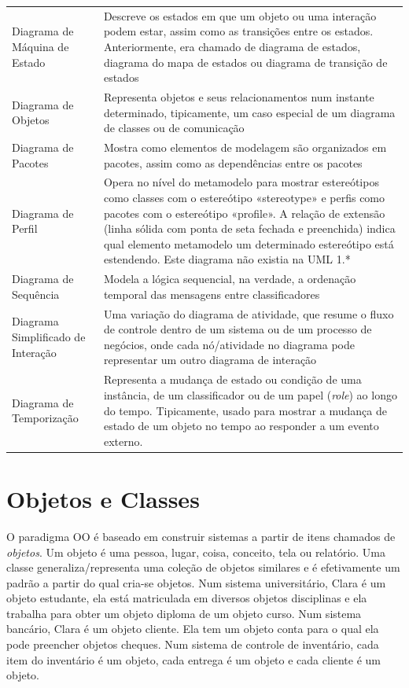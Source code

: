 \begin{longtable}[l]{p{4.7cm}p{11cm}}
Diagrama de Máquina de Estado & Descreve os estados em que um objeto ou uma interação podem estar, assim como as transições entre os estados. Anteriormente, era chamado de diagrama de estados, diagrama do mapa de estados ou diagrama de transição de estados  \\

Diagrama de Objetos & Representa objetos e seus relacionamentos num instante determinado, tipicamente, um caso especial de um diagrama de classes ou de comunicação \\

Diagrama de Pacotes & Mostra como elementos de modelagem são organizados em pacotes, assim como as dependências entre os pacotes \\

Diagrama de Perfil & Opera no nível do metamodelo para mostrar estereótipos como classes com o estereótipo «stereotype» e perfis como pacotes com o estereótipo «profile». A relação de extensão (linha sólida com ponta de seta fechada e preenchida) indica qual elemento metamodelo um determinado estereótipo está estendendo. Este diagrama não existia na UML 1.* \\

Diagrama de Sequência & Modela a lógica sequencial, na verdade, a ordenação temporal das mensagens entre classificadores \\

Diagrama Simplificado de Interação & Uma variação do diagrama de atividade, que resume o fluxo de controle dentro de um sistema ou de um processo de negócios, onde cada nó/atividade no diagrama pode representar um outro diagrama de interação \\

Diagrama de Temporização & Representa a mudança de estado ou condição de uma instância, de um classificador ou de um papel (\textit{role}) ao longo do tempo. Tipicamente, usado para mostrar a mudança de estado de um objeto no tempo ao responder a um evento externo. \\

\end{longtable}

\section{Objetos e Classes}

O paradigma OO é baseado em construir sistemas a partir de itens chamados de \emph{objetos}. Um objeto é uma pessoa, lugar, coisa, conceito, tela ou relatório. Uma classe generaliza/representa uma coleção de objetos similares e é efetivamente um padrão a partir do qual cria-se objetos. Num sistema universitário, Clara é um objeto estudante, ela está matriculada em diversos objetos disciplinas e ela trabalha para obter um objeto diploma de um objeto curso. Num sistema bancário, Clara é um objeto cliente. Ela tem um objeto conta para o qual ela pode preencher objetos cheques. Num sistema de controle de inventário, cada item do inventário é um objeto, cada entrega é um objeto e cada cliente é um objeto.


